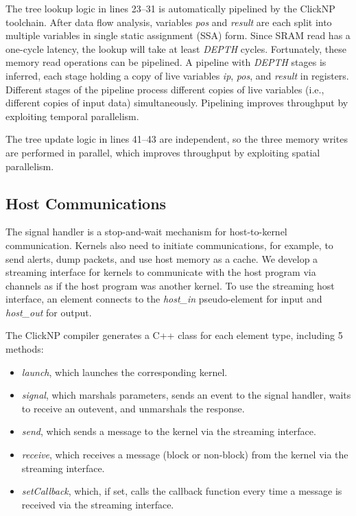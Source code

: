 The tree lookup logic in lines 23--31 is automatically pipelined by the ClickNP toolchain. After data flow analysis, variables \textit{pos} and \textit{result} are each split into multiple variables in single static assignment (SSA) form. Since SRAM read has a one-cycle latency, the lookup will take at least \textit{DEPTH} cycles. Fortunately, these memory read operations can be pipelined. A pipeline with \textit{DEPTH} stages is inferred, each stage holding a copy of live variables \textit{ip}, \textit{pos}, and \textit{result} in registers. Different stages of the pipeline process different copies of live variables (i.e., different copies of input data) simultaneously. Pipelining improves throughput by exploiting temporal parallelism.

The tree update logic in lines 41--43 are independent, so the three memory writes are performed in parallel, which improves throughput by exploiting spatial parallelism.

\subsection{Host Communications}

The signal handler is a stop-and-wait mechanism for host-to-kernel communication. Kernels also need to initiate communications, for example, to send alerts, dump packets, and use host memory as a cache. We develop a streaming interface for kernels to communicate with the host program via channels as if the host program was another kernel. To use the streaming host interface, an element connects to the \textit{host\_in} pseudo-element for input and \textit{host\_out} for output.

The ClickNP compiler generates a C++ class for each element type, including 5 methods:
\begin{itemize}
	\item \textit{launch}, which launches the corresponding kernel.
	\item \textit{signal}, which marshals parameters, sends an event to the signal handler, waits to receive an outevent, and unmarshals the response.
	\item \textit{send}, which sends a message to the kernel via the streaming interface.
	\item \textit{receive}, which receives a message (block or non-block) from the kernel via the streaming interface.
	\item \textit{setCallback}, which, if set, calls the callback function every time a message is received via the streaming interface.
\end{itemize}

